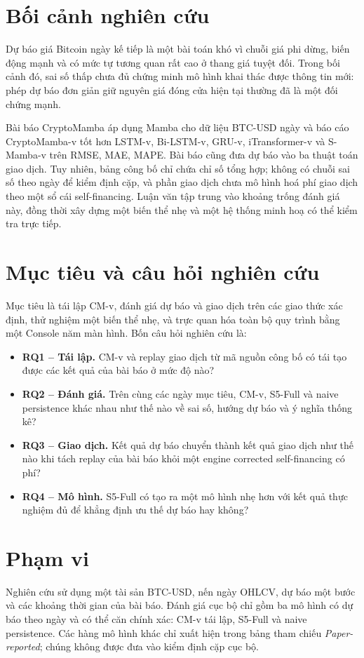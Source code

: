 \documentclass[13pt,a4paper,oneside]{report}
\begin{document}
\section{Bối cảnh nghiên cứu}\label{sec:motivation}
Dự báo giá Bitcoin ngày kế tiếp là một bài toán khó vì chuỗi giá phi dừng, biến động mạnh và có mức
tự tương quan rất cao ở thang giá tuyệt đối. Trong bối cảnh đó, sai số thấp chưa đủ chứng minh mô
hình khai thác được thông tin mới: phép dự báo đơn giản giữ nguyên giá đóng cửa hiện tại thường đã
là một đối chứng mạnh.

Bài báo CryptoMamba \cite{cryptomamba} áp dụng Mamba \cite{mamba} cho dữ liệu BTC-USD ngày và báo
cáo CryptoMamba-v tốt hơn LSTM-v, Bi-LSTM-v, GRU-v, iTransformer-v và S-Mamba-v trên RMSE, MAE,
MAPE. Bài báo cũng đưa dự báo vào ba thuật toán giao dịch. Tuy nhiên, bảng công bố chỉ chứa chỉ số
tổng hợp; không có chuỗi sai số theo ngày để kiểm định cặp, và phần giao dịch chưa mô hình hoá phí
giao dịch theo một sổ cái self-financing. Luận văn tập trung vào khoảng trống đánh giá này, đồng
thời xây dựng một biến thể nhẹ và một hệ thống minh hoạ có thể kiểm tra trực tiếp.

\section{Mục tiêu và câu hỏi nghiên cứu}\label{sec:rq}
Mục tiêu là tái lập CM-v, đánh giá dự báo và giao dịch trên các giao thức xác định, thử nghiệm một
biến thể nhẹ, và trực quan hóa toàn bộ quy trình bằng một Console năm màn hình. Bốn câu hỏi nghiên
cứu là:
\begin{itemize}
\item \textbf{RQ1 -- Tái lập.} CM-v và replay giao dịch từ mã nguồn công bố có tái tạo được các kết
quả của bài báo ở mức độ nào?
\item \textbf{RQ2 -- Đánh giá.} Trên cùng các ngày mục tiêu, CM-v, S5-Full và naive persistence khác
nhau như thế nào về sai số, hướng dự báo và ý nghĩa thống kê?
\item \textbf{RQ3 -- Giao dịch.} Kết quả dự báo chuyển thành kết quả giao dịch như thế nào khi tách
replay của bài báo khỏi một engine corrected self-financing có phí?
\item \textbf{RQ4 -- Mô hình.} S5-Full có tạo ra một mô hình nhẹ hơn với kết quả thực nghiệm đủ để
khẳng định ưu thế dự báo hay không?
\end{itemize}

\section{Phạm vi}\label{sec:scope}
Nghiên cứu sử dụng một tài sản BTC-USD, nến ngày OHLCV, dự báo một bước và các khoảng thời gian của
bài báo. Đánh giá cục bộ chỉ gồm ba mô hình có dự báo theo ngày và có thể căn chính xác: CM-v tái
lập, S5-Full và naive persistence. Các hàng mô hình khác chỉ xuất hiện trong bảng tham chiếu
\emph{Paper-reported}; chúng không được đưa vào kiểm định cặp cục bộ.
\end{document}
